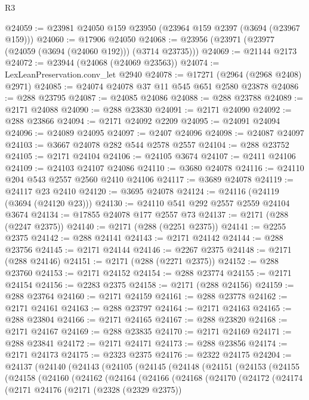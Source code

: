\begin{lexlean}{R3}
\begin{coremodule}
@24059 := @23981 @24050 @159 @23950 (@23964 @159 @2397 (@3694 (@23967 @159)))
@24060 := @17906 @24050
@24068 := @23956 (@23971 (@23977 (@24059 (@3694 (@24060 @192))) (@3714 @23735)))
@24069 := @21144 @2173
@24072 := @23944 (@24068 (@24069 @23563))
@24074 := LexLeanPreservation.conv_let @2940
@24078 := @17271 (@2964 (@2968 @2408) @2971)
@24085 := @24074 @24078 @37 @11 @545 @651 @2580 @23878
@24086 := @288 @23795
@24087 := @24085 @24086
@24088 := @288 @23788
@24089 := @2171 @24088
@24090 := @288 @23830
@24091 := @2171 @24090
@24092 := @288 @23866
@24094 := @2171 @24092 @2209
@24095 := @24091 @24094
@24096 := @24089 @24095
@24097 := @2407 @24096
@24098 := @24087 @24097
@24103 := @3667 @24078 @282 @544 @2578 @2557
@24104 := @288 @23752
@24105 := @2171 @24104
@24106 := @24105 @3674
@24107 := @2411 @24106
@24109 := @24103 @24107 @24086
@24110 := @3680 @24078
@24116 := @24110 @204 @543 @2557 @2560 @2410 @24106
@24117 := @3689 @24078
@24119 := @24117 @23 @2410
@24120 := @3695 @24078
@24124 := @24116 (@24119 (@3694 (@24120 @23)))
@24130 := @24110 @541 @292 @2557 @2559 @24104 @3674
@24134 := @17855 @24078 @177 @2557 @73
@24137 := @2171 (@288 (@2247 @2375))
@24140 := @2171 (@288 (@2251 @2375))
@24141 := @2255 @2375
@24142 := @288 @24141
@24143 := @2171 @24142
@24144 := @288 @23756
@24145 := @2171 @24144
@24146 := @2267 @2375
@24148 := @2171 (@288 @24146)
@24151 := @2171 (@288 (@2271 @2375))
@24152 := @288 @23760
@24153 := @2171 @24152
@24154 := @288 @23774
@24155 := @2171 @24154
@24156 := @2283 @2375
@24158 := @2171 (@288 @24156)
@24159 := @288 @23764
@24160 := @2171 @24159
@24161 := @288 @23778
@24162 := @2171 @24161
@24163 := @288 @23797
@24164 := @2171 @24163
@24165 := @288 @23804
@24166 := @2171 @24165
@24167 := @288 @23820
@24168 := @2171 @24167
@24169 := @288 @23835
@24170 := @2171 @24169
@24171 := @288 @23841
@24172 := @2171 @24171
@24173 := @288 @23856
@24174 := @2171 @24173
@24175 := @2323 @2375
@24176 := @2322 @24175
@24204 := @24137
    (@24140
      (@24143
        (@24105
          (@24145
            (@24148
              (@24151
                (@24153
                  (@24155
                    (@24158
                      (@24160
                        (@24162
                          (@24164
                            (@24166
                              (@24168
                                (@24170
                                  (@24172
                                    (@24174
                                      (@2171
                                        @24176
                                        (@2171
                                          (@2328 (@2329 @2375))

\end{coremodule}
\end{lexlean}
